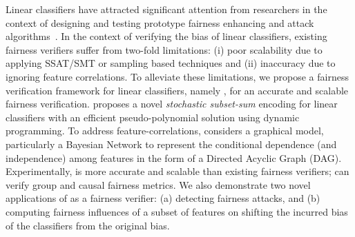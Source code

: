Linear classifiers have attracted significant attention from researchers in the context of designing and testing prototype fairness enhancing and attack algorithms~\cite{pleiss2017fairness,zafar2017fairness,dressel2018accuracy, john2020verifying}. In the context of verifying the bias of linear classifiers, existing fairness verifiers suffer from two-fold limitations: (i) poor scalability due to applying SSAT/SMT or sampling based techniques and (ii) inaccuracy due to ignoring feature correlations. To alleviate these limitations, we propose a fairness verification framework for linear classifiers, namely {\fvgm}, for an accurate and scalable fairness verification. {\fvgm} proposes a novel \textit{stochastic subset-sum} encoding for linear classifiers with an efficient pseudo-polynomial solution using dynamic programming. To address feature-correlations, {\fvgm} considers a graphical model, particularly a Bayesian Network to represent the conditional dependence (and independence) among features in the form of a Directed Acyclic Graph (DAG). Experimentally,  {\fvgm} is more accurate and scalable than existing fairness verifiers; {\fvgm} can verify group and causal fairness metrics. We also demonstrate two novel applications of {\fvgm} as a fairness verifier: (a) detecting fairness attacks, and (b) computing fairness influences of a subset of features on shifting the incurred bias of the classifiers from the original bias.






